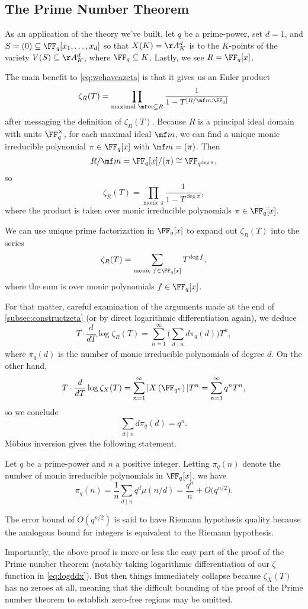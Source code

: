 \documentclass{article}
\begin{document}
\subsection{The Prime Number Theorem}
As an application of the theory we've built, let $q$ be a prime-power, set $d=1$, and $S=(0)\subseteq\FF_q[x_1,\ldots,x_d]$ so that $X(K)=\AA^d_K$ is to the $K$-points of the variety $V(S)\subseteq\AA_K^d$, where $\FF_q\subseteq K$. Lastly, we see $R=\FF_q[x]$.

The main benefit to \autoref{eq:wehaveazeta} is that it gives us an Euler product
\[\zeta_R(T)=\prod_{\text{maximal }\mf m\subseteq R}\frac1{1-T^{[R/\mf m:\FF_q]}}\]
after messaging the definition of $\zeta_R(T)$. Because $R$ is a principal ideal domain with units $\FF_q^\times$, for each maximal ideal $\mf m$, we can find a unique monic irreducible polynomial $\pi\in\FF_q[x]$ with $\mf m=(\pi)$. Then
\[R/\mf m=\FF_q[x]/(\pi)\cong\FF_{q^{\deg\pi}},\]
so
\[\zeta_R(T)=\prod_{\text{monic }\pi}\frac1{1-T^{\deg\pi}},\]
where the product is taken over monic irreducible polynomials $\pi\in\FF_q[x]$.
\begin{remark}
	We can use unique prime factorization in $\FF_q[x]$ to expand out $\zeta_R(T)$ into the series
	\[\zeta_R(T)=\sum_{\text{monic }f\in\FF_q[x]}T^{\deg f},\]
	where the sum is over monic polynomials $f\in\FF_q[x]$.
\end{remark}
For that matter, careful examination of the arguments made at the end of \autoref{subsec:constructzeta} (or by direct logarithmic differentiation again), we deduce
\begin{equation}
	T\cdot\frac d{dT}\log\zeta_R(T)=\sum_{n=1}^\infty\Bigg(\sum_{d\mid n}d\pi_q(d)\Bigg)T^n, \label{eq:logddx}
\end{equation}
where $\pi_q(d)$ is the number of monic irreducible polynomials of degree $d$. On the other hand,
\[T\cdot\frac d{dT}\log\zeta_X(T)=\sum_{n=1}^\infty|X\left(\FF_{q^n}\right)|T^n=\sum_{n=1}^\infty q^nT^n,\]
so we conclude
\[\sum_{d\mid n}d\pi_q(d)=q^n.\]
M\"obius inversion gives the following statement.
\begin{theorem}
	Let $q$ be a prime-power and $n$ a positive integer. Letting $\pi_q(n)$ denote the number of monic irreducible polynomials in $\FF_q[x]$, we have
	\[\pi_q(n)=\frac1n\sum_{d\mid n}q^d\mu(n/d)=\frac{q^n}n+O\big(q^{n/2}\big).\]
\end{theorem}
\begin{remark}
	The error bound of $O\left(q^{n/2}\right)$ is said to have Riemann hypothesis quality because the analogous bound for integers is equivalent to the Riemann hypothesis.
\end{remark}
\begin{remark} \label{rem:reallyjustpnt}
	Importantly, the above proof is more or less the easy part of the proof of the Prime number theorem (notably taking logarithmic differentiation of our $\zeta$ function in \autoref{eq:logddx}). But then things immediately collapse because $\zeta_X(T)$ has no zeroes at all, meaning that the difficult bounding of the proof of the Prime number theorem to establish zero-free regions may be omitted.
\end{remark}
\end{document}

